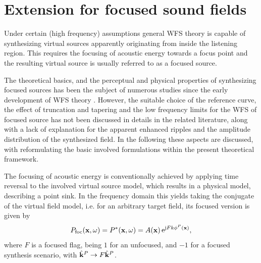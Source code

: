 \documentclass[lettersize,journal]{IEEEtran}
\begin{document}
\section{Extension for focused sound fields}
Under certain (high frequency) assumptions general WFS theory is capable of synthesizing virtual sources apparently originating from inside the listening region.
This requires the focusing of acoustic energy towards a focus point and the resulting virtual source is usually referred to as a focused source.

The theoretical basics, and the perceptual and physical properties of synthesizing focused sources has been the subject of numerous studies since the early development of WFS theory \cite{Verheijen1997:phd, Start1997:phd, Spors2009focused, Wierstorf2013focused}.
However, the suitable choice of the reference curve, the effect of truncation and tapering and the low frequency limits for the WFS of focused source has not been discussed in details in the related literature, along with a lack of explanation for the apparent enhanced ripples and the amplitude distribution of the synthesized field.
In the following these aspects are discussed, with reformulating the basic involved formulations within the present theoretical framework.

The focusing of acoustic energy is conventionally achieved by applying time reversal to the involved virtual source model, which results in a physical model, describing a point sink.
In the frequency domain this yields taking the conjugate of the virtual field model, i.e. for an arbitrary target field, its focused version is given by
\begin{equation}
  P_{\mathrm{foc}}(\mathbf{x},\omega) = P^*(\mathbf{x},\omega) = A(\mathbf{x})\, \mathrm{e}^{ \mathrm{j} F k \phi^P(\mathbf{x})},
\end{equation}
where $F$ is a focused flag, being $1$ for an unfocused, and $-1$ for a focused synthesis scenario, with $\hat{\mathbf{k}}^P \rightarrow F \hat{\mathbf{k}}^P$.
\end{document}
